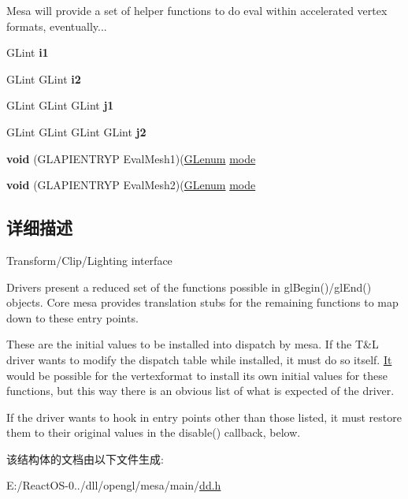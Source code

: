 Mesa will provide a set of helper functions to do eval within accelerated vertex formats, eventually... \begin{DoxyCompactItemize}
\item 
\mbox{\label{struct_g_lvertexformat_a9bff6dc7ff389d7e6bb4ca9b6d286016}} 
G\+Lint {\bfseries i1}
\item 
\mbox{\label{struct_g_lvertexformat_a40b23032b5d7d2f9caa7cadc7d302d55}} 
G\+Lint G\+Lint {\bfseries i2}
\item 
\mbox{\label{struct_g_lvertexformat_a3dfa635cdd9e653e11935801d57b01cb}} 
G\+Lint G\+Lint G\+Lint {\bfseries j1}
\item 
\mbox{\label{struct_g_lvertexformat_a1375cd89dc3fb95930e43fbfe8a8abd1}} 
G\+Lint G\+Lint G\+Lint G\+Lint {\bfseries j2}
\item 
\mbox{\label{struct_g_lvertexformat_a1936c3ff19c8921092771387de4bb6ab}} 
{\bfseries void} (G\+L\+A\+P\+I\+E\+N\+T\+R\+YP Eval\+Mesh1)(\hyperlink{interfacevoid}{G\+Lenum} \hyperlink{interfacevoid}{mode}
\item 
\mbox{\label{struct_g_lvertexformat_aeacc08b8c0c63d38bddb8d09ac835f2a}} 
{\bfseries void} (G\+L\+A\+P\+I\+E\+N\+T\+R\+YP Eval\+Mesh2)(\hyperlink{interfacevoid}{G\+Lenum} \hyperlink{interfacevoid}{mode}
\end{DoxyCompactItemize}


\subsection{详细描述}
Transform/\+Clip/\+Lighting interface

Drivers present a reduced set of the functions possible in gl\+Begin()/gl\+End() objects. Core mesa provides translation stubs for the remaining functions to map down to these entry points.

These are the initial values to be installed into dispatch by mesa. If the T\&L driver wants to modify the dispatch table while installed, it must do so itself. \hyperlink{class_it}{It} would be possible for the vertexformat to install its own initial values for these functions, but this way there is an obvious list of what is expected of the driver.

If the driver wants to hook in entry points other than those listed, it must restore them to their original values in the disable() callback, below. 

该结构体的文档由以下文件生成\+:\begin{DoxyCompactItemize}
\item 
E\+:/\+React\+O\+S-\/0../dll/opengl/mesa/main/\hyperlink{dd_8h}{dd.\+h}\end{DoxyCompactItemize}

